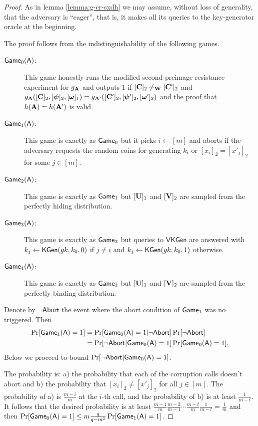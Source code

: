 \begin{proof}
As in lemma \ref{lemma:g-cr-sxdh} we may assume, without loss of generality, that the adversary is ``eager'', that is, it makes all its queries to the key-generator oracle at the beginning.

The proof follows from the indistinguishability of the following games.
\begin{description}
\item[$\mathsf{Game}_0(\mathsf{A})$:] This game honestly runs the modified second-preimage resistance experiment for $g_{\mathbf{{A}}}$ and outputs 1 if $[\mathbf{{C}}]_2 \not\sim_{\mathbf{{W}}}[\mathbf{{C}}']_2$ and $g_{\mathbf{{A}}}([\mathbf{{C}}]_2,[{\boldsymbol{\psi}}]_2,\allowbreak [{\boldsymbol{\omega}}]_1)=g_{\mathbf{{A}}'}([\mathbf{{C}}']_2,[{\boldsymbol{\psi}}']_2,[{\boldsymbol{\omega}}']_2)$ and the proof that $h(\mathbf{{A}})=h(\mathbf{{A}}')$ is valid.
\item[$\mathsf{Game}_1(\mathsf{A})$:] This game is exactly as $\mathsf{Game}_0$ but it picks $i\gets[m]$ and aborts if the adversary requests the random coins for generating $k_i$ or $[x_i]_2=[x'_j]_2$ for some $j\in[m]$.
\item[$\mathsf{Game}_2(\mathsf{A})$:] This game is exactly as $\mathsf{Game}_1$ but $[\mathbf{{U}}]_1$ and $[\mathbf{{V}}]_2$ are sampled from the perfectly hiding distribution.
\item[$\mathsf{Game}_3(\mathsf{A})$:] This game is exactly as $\mathsf{Game}_2$ but queries to $\mathsf{VKGen}$ are answered with $k_j\gets\mathsf{KGen}(gk,k_0,0)$ if $j\neq i$ and $k_j\gets\mathsf{KGen}(gk,k_0,1)$ otherwise.
\item[$\mathsf{Game}_4(\mathsf{A})$:] This game is exactly as $\mathsf{Game}_3$ but $[\mathbf{{U}}]_1$ and $[\mathbf{{V}}]_2$ are sampled from the perfectly binding distribution.
\end{description}
Denote by $\neg\mathsf{Abort}$ the event where the abort condition of $\mathsf{Game}_1$ was no triggered. Then
\begin{align*}
\Pr[\mathsf{Game}_1(\mathsf{A})=1] &= \Pr[\mathsf{Game}_0(\mathsf{A})=1|\neg\mathsf{Abort}]\Pr[\neg\mathsf{Abort}]\\
&=\Pr[\neg\mathsf{Abort}|\mathsf{Game}_0(\mathsf{A})=1]\Pr[\mathsf{Game}_0(\mathsf{A})=1].
\end{align*}
Below we proceed to bound $\Pr[\neg\mathsf{Abort}|\mathsf{Game}_0(\mathsf{A})=1]$.

The probability is: a) the probability that each of the corruption calls doesn't abort and b) the probability that $[x_i]_2\neq[x'_j]_2$ for all $j\in[m]$. The probability of a) is $\frac{m-i}{m}$ at the $i$-th call, and the probability of b) is at least $\frac{1}{m-t}$. It follows that the desired probability is at least $\frac{m-1}{m}\frac{m-2}{m-1}\cdots\frac{m-t}{m}\frac{1}{m-t}=\frac{1}{m}$ and then $\Pr[\mathsf{Game}_0(\mathsf{A})=1]\leq m\frac{q}{q-m^2} \Pr[\mathsf{Game}_1(\mathsf{A})=1]$.


\end{proof}
